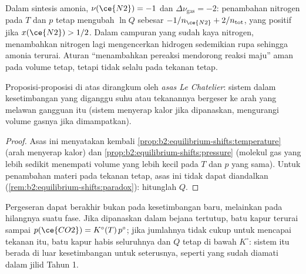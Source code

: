\begin{remark}\label{rem:b2:equilibrium-shifts:paradox}
Dalam sintesis amonia, $\nu(\ce{N2}) = -1$ dan $\Delta\nu_{\text{gas}} = -2$:
penambahan nitrogen pada $T$ dan $p$ tetap mengubah $\ln Q$ sebesar
$-1/n_{\ce{N2}} +
2/n_{\text{tot}}$, yang positif jika
$x(\ce{N2}) > 1/2$. Dalam campuran yang sudah kaya nitrogen, menambahkan
nitrogen lagi mengencerkan hidrogen sedemikian rupa sehingga amonia
terurai. Aturan ``menambahkan pereaksi mendorong reaksi maju'' aman pada
volume tetap, tetapi tidak selalu pada tekanan tetap.
\end{remark}

\begin{proposition}\label{prop:b2:equilibrium-shifts:le-chatelier}
Proposisi-proposisi di atas dirangkum oleh \emph{asas Le
Chatelier}: sistem dalam kesetimbangan yang
diganggu suhu atau tekanannya bergeser ke arah yang melawan gangguan itu
(sistem menyerap kalor jika dipanaskan, mengurangi volume gasnya jika
dimampatkan).
\end{proposition}

\begin{proof}
Asas ini menyatakan kembali \cref{prop:b2:equilibrium-shifts:temperature}
(arah  menyerap kalor) dan \cref{prop:b2:equilibrium-shifts:pressure}
(molekul gas yang lebih sedikit menempati volume yang lebih kecil pada $T$
dan $p$ yang sama). Untuk penambahan materi pada tekanan tetap, asas ini
tidak dapat diandalkan (\cref{rem:b2:equilibrium-shifts:paradox}):
hitunglah $Q$.
\end{proof}

\begin{remark}\label{rem:b2:equilibrium-shifts:rupture}
Pergeseran dapat berakhir bukan pada kesetimbangan baru, melainkan pada
hilangnya suatu fase. Jika dipanaskan dalam bejana tertutup, batu kapur
terurai sampai $p(\ce{CO2}) =
K^\circ(T)\,p^\circ$; jika jumlahnya tidak
cukup untuk mencapai tekanan itu, batu kapur habis seluruhnya dan $Q$
tetap di bawah $K^\circ$: sistem itu berada di luar kesetimbangan untuk
seterusnya, seperti yang sudah diamati dalam jilid Tahun 1.
\end{remark}

